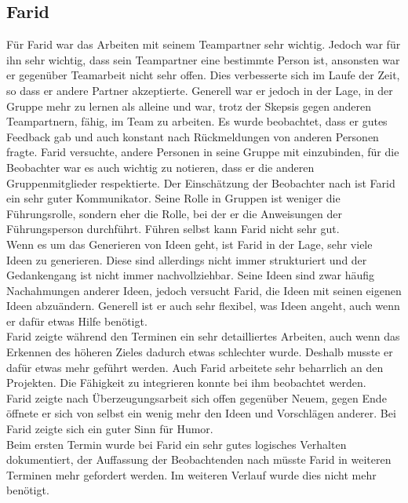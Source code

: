 \subsection{Farid}
Für Farid war das Arbeiten mit seinem Teampartner sehr wichtig. Jedoch war für ihn sehr wichtig, dass sein Teampartner eine bestimmte Person ist, ansonsten war er gegenüber Teamarbeit nicht sehr offen. Dies verbesserte sich im Laufe der Zeit, so dass er andere Partner akzeptierte. Generell war er jedoch in der Lage, in der Gruppe mehr zu lernen als alleine und war, trotz der Skepsis gegen anderen Teampartnern, fähig, im Team zu arbeiten. Es wurde beobachtet, dass er gutes Feedback gab und auch konstant nach Rückmeldungen von anderen Personen fragte. Farid versuchte, andere Personen in seine Gruppe mit einzubinden, für die Beobachter war es auch wichtig zu notieren, dass er die anderen Gruppenmitglieder respektierte. Der Einschätzung der Beobachter nach ist Farid ein sehr guter Kommunikator. Seine Rolle in Gruppen ist weniger die Führungsrolle, sondern eher die Rolle, bei der er die Anweisungen der Führungsperson durchführt. Führen selbst kann Farid nicht sehr gut.\\

Wenn es um das Generieren von Ideen geht, ist Farid in der Lage, sehr viele Ideen zu generieren. Diese sind allerdings nicht immer strukturiert und der Gedankengang ist nicht immer nachvollziehbar. Seine Ideen sind zwar häufig Nachahmungen anderer Ideen, jedoch versucht Farid, die Ideen mit seinen eigenen Ideen abzuändern. Generell ist er auch sehr flexibel, was Ideen angeht, auch wenn er dafür etwas Hilfe benötigt.\\
Farid zeigte während den Terminen ein sehr detailliertes Arbeiten, auch wenn das Erkennen des höheren Zieles dadurch etwas schlechter wurde. Deshalb musste er dafür etwas mehr geführt werden. Auch Farid arbeitete sehr beharrlich an den Projekten. Die Fähigkeit zu integrieren konnte bei ihm beobachtet werden.\\
Farid zeigte nach Überzeugungsarbeit sich offen gegenüber Neuem, gegen Ende öffnete er sich von selbst ein wenig mehr den Ideen und Vorschlägen anderer. Bei Farid zeigte sich ein guter Sinn für Humor. \\
Beim ersten Termin wurde bei Farid ein sehr gutes logisches Verhalten dokumentiert, der Auffassung der Beobachtenden nach müsste Farid in weiteren Terminen mehr gefordert werden. Im weiteren Verlauf wurde dies nicht mehr benötigt.\\

